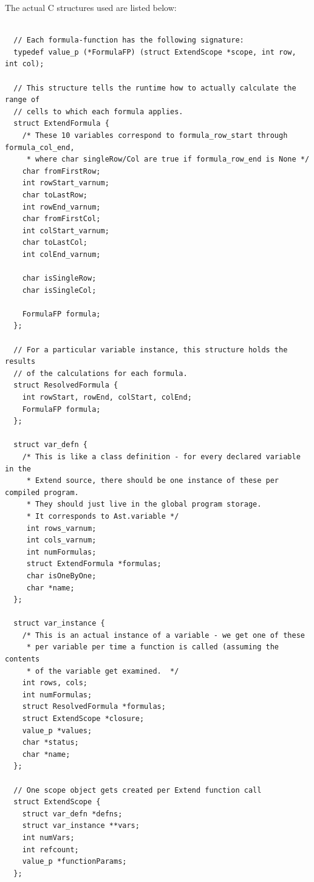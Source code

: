   The actual C structures used are listed below:
  \begin{lstlisting}

  // Each formula-function has the following signature:
  typedef value_p (*FormulaFP) (struct ExtendScope *scope, int row, int col);

  // This structure tells the runtime how to actually calculate the range of
  // cells to which each formula applies.
  struct ExtendFormula {
    /* These 10 variables correspond to formula_row_start through formula_col_end,
     * where char singleRow/Col are true if formula_row_end is None */
    char fromFirstRow;
    int rowStart_varnum;
    char toLastRow;
    int rowEnd_varnum;
    char fromFirstCol;
    int colStart_varnum;
    char toLastCol;
    int colEnd_varnum;

  	char isSingleRow;
  	char isSingleCol;

    FormulaFP formula;
  };

  // For a particular variable instance, this structure holds the results
  // of the calculations for each formula.
  struct ResolvedFormula {
  	int rowStart, rowEnd, colStart, colEnd;
  	FormulaFP formula;
  };

  struct var_defn {
    /* This is like a class definition - for every declared variable in the
     * Extend source, there should be one instance of these per compiled program.
     * They should just live in the global program storage.
     * It corresponds to Ast.variable */
     int rows_varnum;
     int cols_varnum;
     int numFormulas;
     struct ExtendFormula *formulas;
  	 char isOneByOne;
  	 char *name;
  };

  struct var_instance {
    /* This is an actual instance of a variable - we get one of these
     * per variable per time a function is called (assuming the contents
     * of the variable get examined.  */
  	int rows, cols;
  	int numFormulas;
  	struct ResolvedFormula *formulas;
    struct ExtendScope *closure;
    value_p *values;
  	char *status;
  	char *name;
  };

  // One scope object gets created per Extend function call
  struct ExtendScope {
    struct var_defn *defns;
    struct var_instance **vars;
  	int numVars;
  	int refcount;
  	value_p *functionParams;
  };
  \end{lstlisting}
